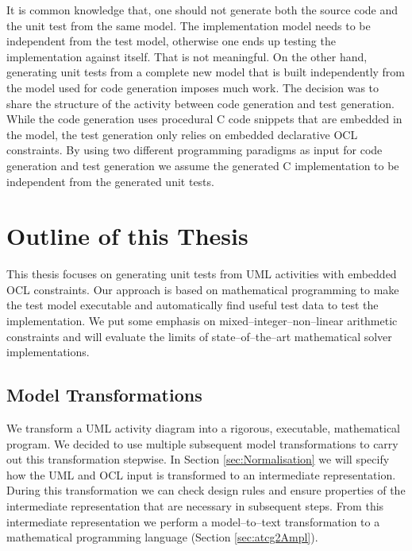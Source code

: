 It is common knowledge that, one should not generate both the source code and the unit test from the same model. The implementation model needs to be independent from the test model, otherwise one ends up testing the implementation against itself. That is not meaningful. %
On the other hand, generating unit tests from a complete new model that is built independently from the model used for code generation imposes much work. The decision was to share the structure of the activity between code generation and test generation. While the code generation uses procedural C code snippets that are embedded in the model, the test generation only relies on embedded declarative OCL constraints. By using two different programming paradigms as input for code generation and test generation we assume the generated C implementation to be independent from the generated unit tests.


\section{Outline of this Thesis}
This thesis focuses on generating unit tests from UML activities with embedded OCL constraints. Our approach is based on mathematical programming to make the test model executable and automatically find useful test data to test the implementation. We put some emphasis on mixed--integer--non--linear arithmetic constraints and will evaluate the limits of state--of--the--art mathematical solver implementations.
\subsection{Model Transformations}
We transform a UML activity diagram into a rigorous, executable, mathematical program. We decided to use multiple subsequent model transformations to carry out this transformation stepwise. In Section \ref{sec:Normalisation} we will specify how the UML and OCL input is transformed to an intermediate representation. During this transformation we can check design rules and ensure properties of the intermediate representation that are necessary in subsequent steps. From this intermediate representation we perform a model--to--text transformation to a mathematical programming language (Section \ref{sec:atcg2Ampl}).
